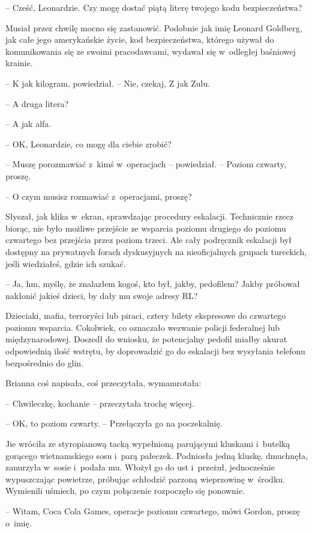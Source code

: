 \documentclass[oneside,polish,11pt,rmheadings]{mwbk}
\begin{document}
-- Cześć, Leonardzie. Czy mogę dostać piątą literę twojego kodu bezpieczeństwa?

Musiał przez chwilę mocno się zastanowić. Podobnie jak imię Leonard Goldberg, jak całe jego amerykańskie życie, kod bezpieczeństwa, którego używał do komunikowania się ze swoimi pracodawcami, wydawał się w~odległej baśniowej krainie. 

-- K jak kilogram, powiedział. -- Nie, czekaj, Z jak Zulu. 

-- A druga litera?

-- A jak alfa.

-- OK, Leonardzie, co mogę dla ciebie zrobić? 

-- Muszę porozmawiać z~kimś w~operacjach -- powiedział. -- Poziom czwarty, proszę. 

-- O czym musisz rozmawiać z~operacjami, proszę? 

Słyszał, jak klika w~ekran, sprawdzając procedury eskalacji. Technicznie rzecz biorąc, nie było możliwe przejście ze wsparcia poziomu drugiego do poziomu czwartego bez przejścia przez poziom trzeci. Ale cały podręcznik eskalacji był dostępny na prywatnych forach dyskusyjnych na nieoficjalnych grupach tureckich, jeśli wiedziałeś, gdzie ich szukać.

-- Ja, hm, myślę, że znalazłem kogoś, kto był, jakby, pedofilem? Jakby próbował nakłonić jakieś dzieci, by dały mu swoje adresy RL? 

Dzieciaki, mafia, terroryści lub piraci, cztery bilety ekspresowe do czwartego poziomu wsparcia. Cokolwiek, co oznaczało wezwanie policji federalnej lub międzynarodowej. Doszedł do wniosku, że potencjalny pedofil miałby akurat odpowiednią ilość wstrętu, by doprowadzić go do eskalacji bez wysyłania telefonu bezpośrednio do glin.

Brianna coś napisała, coś przeczytała, wymamrotała: 

-- Chwileczkę, kochanie -- przeczytała trochę więcej. 

-- OK, to poziom czwarty. -- Przełączyła go na poczekalnię.

Jie wróciła ze styropianową tacką wypełnioną parującymi kluskami i~butelką gorącego wietnamskiego sosu i~parą pałeczek. Podniosła jedną kluskę, dmuchnęła, zanurzyła w~sosie i~podała mu. Włożył go do ust i~przeżuł, jednocześnie wypuszczając powietrze, próbując schłodzić parzoną wieprzowinę w~środku. Wymienili uśmiech, po czym połączenie rozpoczęło się ponownie.

-- Witam, Coca Cola Games, operacje poziomu czwartego, mówi Gordon, proszę o~imię.
\end{document}
